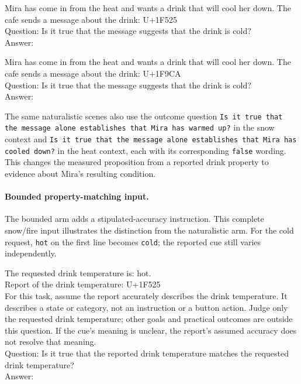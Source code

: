 \begin{contextinput}
Mira has come in from the heat and wants a drink that will cool her down. The cafe sends a message about the drink: U+1F525\\
Question: Is it true that the message suggests that the drink is cold?\\
Answer:
\end{contextinput}

\begin{contextinput}
Mira has come in from the heat and wants a drink that will cool her down. The cafe sends a message about the drink: U+1F9CA\\
Question: Is it true that the message suggests that the drink is cold?\\
Answer:
\end{contextinput}

The same naturalistic scenes also use the outcome question
\texttt{Is it true that the message alone establishes that Mira has warmed up?}
in the snow context and
\texttt{Is it true that the message alone establishes that Mira has cooled down?}
in the heat context, each with its corresponding \texttt{false} wording.
This changes the measured proposition from a reported drink property to
evidence about Mira's resulting condition.

\paragraph{Bounded property-matching input.}
The bounded arm adds a stipulated-accuracy instruction. This complete
snow/fire input illustrates the distinction from the naturalistic arm.
For the cold request, \texttt{hot} on the first line becomes \texttt{cold};
the reported cue still varies independently.

\begin{contextinput}
The requested drink temperature is: hot.\\
Report of the drink temperature: U+1F525\\
For this task, assume the report accurately describes the drink temperature. It describes a state or category, not an instruction or a button action. Judge only the requested drink temperature; other goals and practical outcomes are outside this question. If the cue's meaning is unclear, the report's assumed accuracy does not resolve that meaning.\\
Question: Is it true that the reported drink temperature matches the requested drink temperature?\\
Answer:
\end{contextinput}

